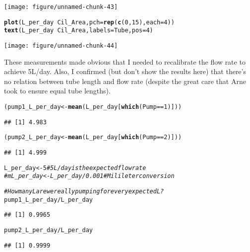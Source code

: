 \documentclass[12pt,a4paper,draft]{article}\usepackage[]{graphicx}\usepackage[]{color}
\makeatletter
\def\maxwidth{ %
  \ifdim\Gin@nat@width>\linewidth
    \linewidth
  \else
    \Gin@nat@width
  \fi
}
\newcommand{\hlnum}[1]{\textcolor[rgb]{0.686,0.059,0.569}{#1}}%
\newcommand{\hlcom}[1]{\textcolor[rgb]{0.678,0.584,0.686}{\textit{#1}}}%
\newcommand{\hlopt}[1]{\textcolor[rgb]{0,0,0}{#1}}%
\newcommand{\hlstd}[1]{\textcolor[rgb]{0.345,0.345,0.345}{#1}}%
\newcommand{\hlkwb}[1]{\textcolor[rgb]{0.69,0.353,0.396}{#1}}%
\newcommand{\hlkwc}[1]{\textcolor[rgb]{0.333,0.667,0.333}{#1}}%
\newcommand{\hlkwd}[1]{\textcolor[rgb]{0.737,0.353,0.396}{\textbf{#1}}}%
\newenvironment{kframe}{%
 \def\at@end@of@kframe{}%
 \ifinner\ifhmode%
  \def\at@end@of@kframe{\end{minipage}}%
  \begin{minipage}{\columnwidth}%
 \fi\fi%
 \def\FrameCommand##1{\hskip\@totalleftmargin \hskip-\fboxsep
 \colorbox{shadecolor}{##1}\hskip-\fboxsep
     \hskip-\linewidth \hskip-\@totalleftmargin \hskip\columnwidth}%
 \MakeFramed {\advance\hsize-\width
   \@totalleftmargin\z@ \linewidth\hsize
   \@setminipage}}%
 {\par\unskip\endMakeFramed%
 \at@end@of@kframe}
\newenvironment{knitrout}{}{} %
\makeatother
\begin{document}
\begin{knitrout}
{\centering \texttt{[image: figure/unnamed-chunk-43]} 

}


\begin{kframe}\begin{alltt}
\hlkwd{plot}\hlstd{(L_per_day}\hlopt{~}\hlstd{Cil_Area,} \hlkwc{pch}\hlstd{=}\hlkwd{rep}\hlstd{(}\hlkwd{c}\hlstd{(}\hlnum{0}\hlstd{,} \hlnum{15}\hlstd{),} \hlkwc{each}\hlstd{=}\hlnum{4}\hlstd{))}
\hlkwd{text}\hlstd{(L_per_day}\hlopt{~}\hlstd{Cil_Area,} \hlkwc{labels}\hlstd{=Tube,} \hlkwc{pos}\hlstd{=}\hlnum{4}\hlstd{)}
\end{alltt}
\end{kframe}

{\centering \texttt{[image: figure/unnamed-chunk-44]} 

}



\end{knitrout}

These measurements made obvious that I needed to recalibrate the flow rate to achieve 5L/day. Also, I confirmed (but don't show the results here) that there's no relation between tube length and flow rate (despite the great care that Arne took to ensure equal tube lengths).

\begin{knitrout}
\color{fgcolor}\begin{kframe}
\begin{alltt}
\hlstd{(pump1_L_per_day} \hlkwb{<-} \hlkwd{mean}\hlstd{( L_per_day[} \hlkwd{which}\hlstd{(Pump}\hlopt{==}\hlnum{1}\hlstd{) ] ))}
\end{alltt}
\begin{verbatim}
## [1] 4.983
\end{verbatim}
\begin{alltt}
\hlstd{(pump2_L_per_day} \hlkwb{<-} \hlkwd{mean}\hlstd{( L_per_day[} \hlkwd{which}\hlstd{(Pump}\hlopt{==}\hlnum{2}\hlstd{) ] ))}
\end{alltt}
\begin{verbatim}
## [1] 4.999
\end{verbatim}
\begin{alltt}
\hlstd{L_per_day} \hlkwb{<-} \hlnum{5}  \hlcom{# 5L/day is the expected flow rate}
\hlcom{#mL_per_day <- L_per_day / 0.001  # Milileter conversion}

\hlcom{# How many L are we really pumping for every expected L?}
\hlstd{pump1_L_per_day} \hlopt{/} \hlstd{L_per_day}
\end{alltt}
\begin{verbatim}
## [1] 0.9965
\end{verbatim}
\begin{alltt}
\hlstd{pump2_L_per_day} \hlopt{/} \hlstd{L_per_day}
\end{alltt}
\begin{verbatim}
## [1] 0.9999
\end{verbatim}
\end{kframe}
\end{knitrout}
\end{document}

